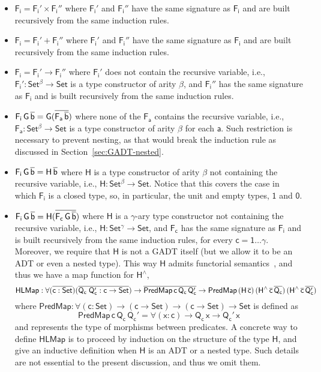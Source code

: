 \documentclass[9pt]{entcs} \usepackage{entcsmacro}
\begin{document}
\begin{itemize}
\item $\mathsf{F_i = F_i' \times F_i''}$ where $\mathsf{F_i'}$ and $\mathsf{F_i''}$ have the same signature as $\mathsf{F_i}$ and are built recursively from the same induction rules.
\item $\mathsf{F_i = F_i' + F_i''}$ where $\mathsf{F_i'}$ and $\mathsf{F_i''}$ have the same signature as $\mathsf{F_i}$ and are built recursively from the same induction rules.
\item $\mathsf{F_i = F_i' \to F_i''}$
where $\mathsf{F_i'}$ does not contain the recursive variable,
i.e., $\mathsf{F_i' : Set^\beta \to Set}$ is a type constructor of arity $\mathsf{\beta}$,
and $\mathsf{F_i''}$ has the same signature as $\mathsf{F_i}$ and is built recursively from the same induction rules.
\item $\mathsf{F_i\,G\,\overline{b} = G(\overline{F_a\,\overline{b}})}$
where none of the $\mathsf{F_a}$ contains the recursive variable,
i.e., $\mathsf{F_a : Set^\beta \to Set}$
is a type constructor of arity $\mathsf{\beta}$
for each $\mathsf{a}$.
Such restriction is necessary to prevent nesting,
as that would break the induction rule as discussed in Section~\ref{sec:GADT-nested}.
\item $\mathsf{F_i\,G\,\overline{b} = H\,\overline{b}}$
where $\mathsf{H}$ is a type constructor of arity $\mathsf{\beta}$ not containing the recursive variable,
i.e., $\mathsf{H : Set^\beta \to Set}$.
Notice that this covers the case in which $\mathsf{F_i}$ is a closed type,
so, in particular, the unit and empty types, $\mathsf{1}$ and $\mathsf{0}$.
\item $\mathsf{F_i\,G\,\overline{b} = H (\overline{F_c\,G\,\overline{b}})}$
where $\mathsf{H}$ is a $\mathsf{\gamma}$-ary type constructor not containing the recursive variable,
i.e., $\mathsf{H : Set^\gamma \to Set}$,
and $\mathsf{F_c}$ has the same signature as $\mathsf{F_i}$  and is built recursively from the same induction rules, for every $\mathsf{c = 1 \dots \gamma}$.
Moreover, we require that $\mathsf{H}$ is not a GADT itself (but we allow it to be an ADT or even a nested type).
This way $\mathsf{H}$ admits functorial semantics~\cite{jp20}, and thus we have a map function for $\mathsf{H^{\wedge}}$,
\[
\mathsf{HLMap : \forall (\overline{c : Set}) (\overline{Q_c\;Q_c' : c \to Set})
	\to \overline{PredMap\,c\,Q_c\,Q_c'}
	\to PredMap\,(H\,\overline{c})\,(H^{\wedge}\,\overline{c}\,\overline{Q_c})\,(H^{\wedge}\,\overline{c}\,\overline{Q_c'})}
\]
where $\mathsf{PredMap : \forall (c : Set) \to (c \to Set) \to (c \to Set) \to Set}$
is defined as
\[
\mathsf{PredMap\,c\,Q_c\,Q_c' = \forall (x : c) \to Q_c\,x \to Q_c'\,x}
\]
and represents the type of morphisms between predicates.
A concrete way to define $\mathsf{HLMap}$ is to proceed by induction on the structure of the type $\mathsf{H}$,
and give an inductive definition when $\mathsf{H}$ is an ADT or a nested type.
Such details are not essential to the present discussion, and thus we omit them.
\end{itemize}
\end{document}
